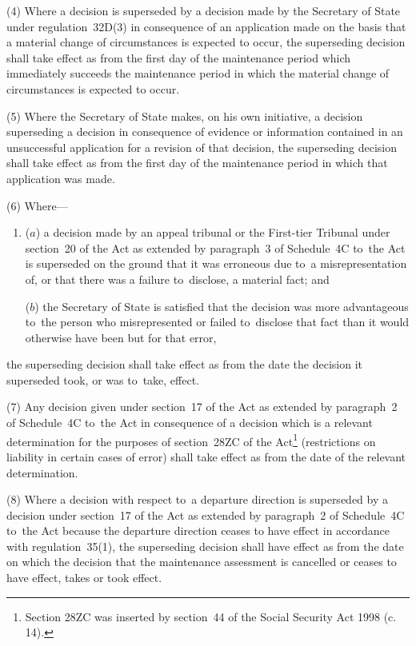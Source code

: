 \documentclass[12pt,a4paper]{article}
\begin{document}
(4) Where a decision is superseded by a decision made by the Secretary of State under regulation~32D(3) in consequence of an application made on the basis that a material change of circumstances is expected to occur, the superseding decision shall take effect as from the first day of the maintenance period which immediately succeeds the maintenance period in which the material change of circumstances is expected to occur.

(5) Where the Secretary of State makes, on his own initiative, a decision superseding a decision in consequence of evidence or information contained in an unsuccessful application for a revision of that decision, the superseding decision shall take effect as from the first day of the maintenance period in which that application was made.

(6) Where---
\begin{enumerate}\item[]
($a$) a decision made by 
an appeal tribunal or  %
the First-tier Tribunal  %
under section~20 of the Act as extended by paragraph~3 of Schedule~4C to~the Act is superseded on the ground that it was erroneous due to~a misrepresentation of, or that there was a failure to~disclose, a material fact; and

($b$) the Secretary of State is satisfied that the decision was more advantageous to~the person who misrepresented or failed to~disclose that fact than it would otherwise have been but for that error,
\end{enumerate}
the superseding decision shall take effect as from the date the decision it superseded took, or was to~take, effect.

(7) Any decision given under section~17 of the Act as extended by paragraph~2 of Schedule~4C to~the Act in consequence of a decision which is a relevant determination for the purposes of section~28ZC of the Act\footnote{\frenchspacing Section 28ZC was inserted by section~44 of the Social Security Act 1998 (c. 14).} (restrictions on liability in certain cases of error) shall take effect as from the date of the relevant determination.

(8) Where a decision with respect to~a departure direction is superseded by a decision under section~17 of the Act as extended by paragraph~2 of Schedule~4C to~the Act because the departure direction ceases to have effect in accordance with regulation~35(1), the superseding decision shall have effect as from the date on which the decision that the maintenance assessment is cancelled or ceases to have effect, takes or took effect.
\end{document}
